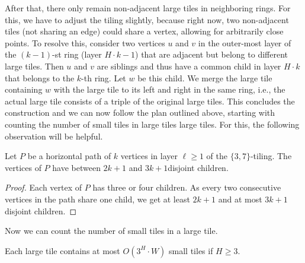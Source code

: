 %
After that, there only remain non-adjacent large tiles in neighboring rings.
For this, we have to adjust the tiling slightly, because right now, two non-adjacent tiles (not sharing an edge) could share a vertex, allowing for arbitrarily close points.
To resolve this, consider two vertices $u$ and $v$ in the outer-most layer of the $(k - 1)$-st ring (layer $H \cdot k - 1$) that are adjacent but belong to different large tiles.
Then $u$ and $v$ are siblings and thus have a common child in layer $H \cdot k$ that belongs to the $k$-th ring.
Let $w$ be this child.
We merge the large tile containing $w$ with the large tile to its left and right in the same ring, i.e., the actual large tile consists of a triple of the original large tiles.
%
This concludes the construction and we can now follow the plan outlined above, starting with counting the number of small tiles in large tiles large tiles.
For this, the following observation will be helpful.
%
\begin{lemma}
    \label{lem:3_7_tiling_exponential_growth}
    Let $P$ be a horizontal path of $k$ vertices in layer $\ell \ge 1$ of the $\{3, 7\}$-tiling.
    The vertices of $P$ have between $2k + 1$ and $3k + 1$disjoint children.
\end{lemma}
\begin{proof}
    Each vertex of $P$ has three or four children.
    As every two consecutive vertices in the path share one child, we get at least $2k + 1$ and at most $3k + 1$ disjoint children.
\end{proof}
%
Now we can count the number of small tiles in a large tile.
%
\begin{lemma}
    \label{lem:tiling_large_r_count_small_tiles}
    Each large tile contains at most $O(3^H \cdot W)$ small tiles if $H \ge 3$.
\end{lemma}

